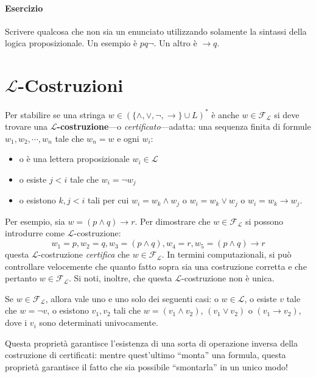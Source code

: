 \paragraph{Esercizio}
Scrivere qualcosa che non sia un enunciato utilizzando solamente la sintassi della 
logica proposizionale. Un esempio è $p q \neg$. Un altro è $\rightarrow q$.

\section{$\mathscr{L}$-Costruzioni}
Per stabilire se una stringa $w \in (\{\land, \lor, \neg, \rightarrow\}
\cup L)^*$ è anche $w \in \mathscr{F}_\mathscr{L}$ si deve trovare una \textbf{$\mathscr{L}$-costruzione}—o \textit{certificato}—adatta: una sequenza finita di formule $w_1, w_2, \cdots, w_n$ tale che $w_n = w$ e ogni $w_i$:
\begin{itemize}
  \item o è una lettera proposizionale $w_i \in \mathscr{L}$ 
  \item o esiste $j < i$ tale che $w_i = \neg w_j$
  \item o esistono $k,j < i$ tali per cui $w_i = w_k \land w_j$ o $w_i = w_k \lor w_j$ o $w_i = w_k \rightarrow w_j$.
\end{itemize}

Per esempio, sia $w = (p\land q)\rightarrow r$. Per dimostrare che $w \in \mathscr{F}_\mathscr{L}$ si possono introdurre come $\mathscr{L}$-costruzione:
$$
w_1 = p, w_2 = q, w_3 = (p\land q), w_4 = r, w_5 = (p \land q) \rightarrow r
$$
questa $\mathscr{L}$-costruzione \textit{certifica} che $w \in \mathscr{F}_\mathscr{L}$.
In termini computazionali, si può controllare velocemente che quanto fatto 
sopra sia una costruzione corretta e che pertanto $w \in \mathscr{F}_\mathscr{L}$. Si noti, inoltre, 
che questa $\mathscr{L}$-costruzione non è unica.
\begin{pro}
Se $w \in \mathscr{F}_\mathscr{L}$, allora vale uno e uno solo dei seguenti casi: o $w \in \mathscr{L}$, 
o esiste $v$ tale che $w = \neg v$, o esistono $v_1, v_2$ tali che 
$w = (v_1 \land v_2)$, 
$(v_1 \lor v_2)$ o $(v_1 \rightarrow v_2)$, dove i $v_i$ sono determinati 
univocamente. 
\end{pro}
Questa proprietà garantisce l'esistenza di una sorta di operazione 
inversa della costruzione di certificati: mentre quest'ultimo ``monta'' 
una formula, questa proprietà garantisce il fatto che sia possibile 
``smontarla'' in un unico modo!

